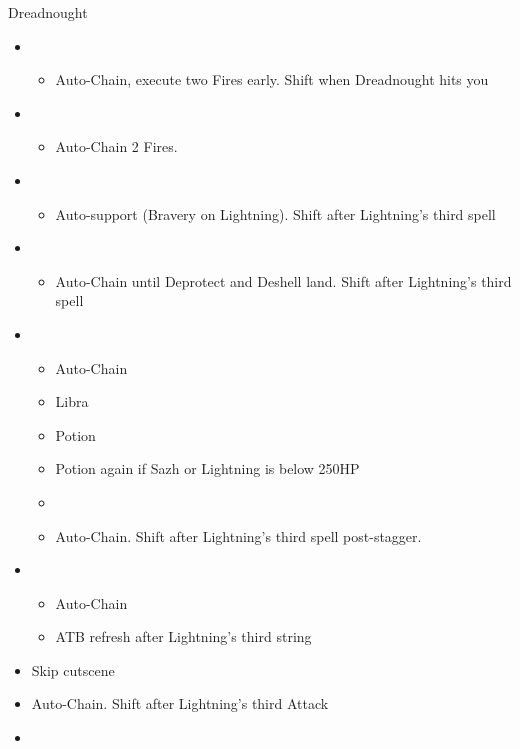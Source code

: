 \begin{battle}[2:16]{Dreadnought}
	\begin{multicols}{2}
		\begin{itemize}
			\item \fourth
			      \begin{itemize}
				      \item Auto-Chain, execute two Fires early. Shift when Dreadnought hits you
			      \end{itemize}
			\item \fifth
			      \begin{itemize}
				      \item Auto-Chain 2 Fires.
			      \end{itemize}
			\item \sixth
			      \begin{itemize}
				      \item Auto-support (Bravery on Lightning). Shift after Lightning’s third spell
			      \end{itemize}
			\item \fourth
			      \begin{itemize}
				      \item Auto-Chain until Deprotect and Deshell land. Shift after Lightning’s third spell
			      \end{itemize}
			\item \fifth
			      \begin{itemize}
				      \item Auto-Chain
				      \item Libra
				      \item Potion
				      \item Potion again if Sazh or Lightning is below 250HP
				      \item \stagger
				      \item Auto-Chain. Shift after Lightning’s third spell post-stagger.
			      \end{itemize}
			\item \first
			      \begin{itemize}
				      \item Auto-Chain
				      \item ATB refresh after Lightning's third string
			      \end{itemize}
			\item Skip cutscene
			      \columnbreak
			\item Auto-Chain. Shift after Lightning’s third Attack
			\item \sixth

\end{itemize}
\end{multicols}
\end{battle}
